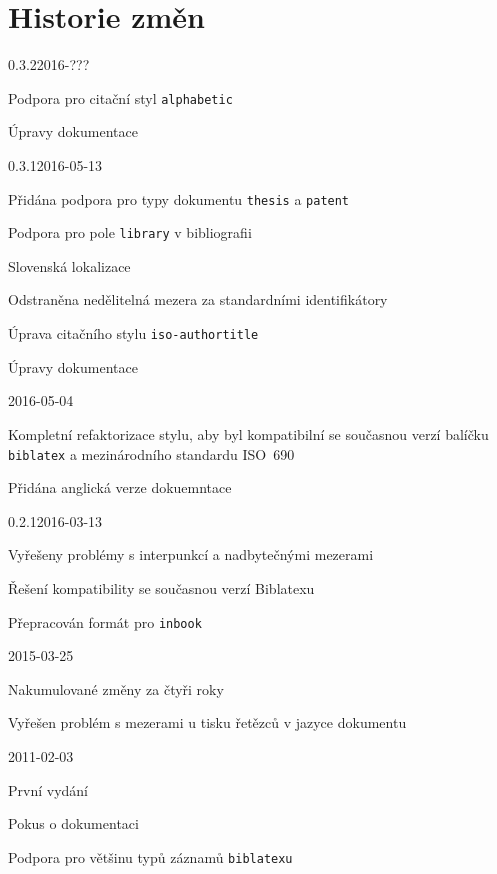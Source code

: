 \documentclass[a4paper,10pt]{ltxdockit}
\def\t|#1|{\texttt{#1}}
\begin{document}
\section{Historie změn}
\begin{changelog}
 
\begin{release}{0.3.2}{2016-???}
\item Podpora pro citační styl \t|alphabetic|
\item Úpravy dokumentace
\end{release}

\begin{release}{0.3.1}{2016-05-13}
\item Přidána podpora pro typy dokumentu \t|thesis| a \t|patent|
\item Podpora pro pole \t|library| v bibliografii
\item Slovenská lokalizace 
\item Odstraněna nedělitelná mezera za standardními identifikátory
\item Úprava citačního stylu \t|iso-authortitle|
\item Úpravy dokumentace
\end{release}

\begin{release}{0.3}{2016-05-04}
\item Kompletní refaktorizace stylu, aby byl kompatibilní se současnou verzí balíčku \t|biblatex| 
   a mezinárodního standardu ISO~690 
\item Přidána anglická verze dokuemntace
\end{release}
\begin{release}{0.2.1}{2016-03-13}
\item Vyřešeny problémy s interpunkcí a nadbytečnými mezerami
\item Řešení kompatibility se současnou verzí Biblatexu
\item Přepracován formát pro \verb|inbook|
\end{release}
\begin{release}{0.2}{2015-03-25}
\item Nakumulované změny za čtyři roky
\item Vyřešen problém s mezerami u tisku řetězců v jazyce dokumentu
\end{release}
\begin{release}{0.1}{2011-02-03}
\item První vydání
\item Pokus o dokumentaci
\item Podpora pro většinu typů záznamů \t|biblatexu|
\end{release}
\end{changelog}
\end{document}
